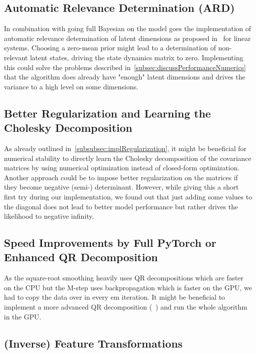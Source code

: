 	\subsection{Automatic Relevance Determination (ARD)}
		\label{subsec:ard}

		In combination with going full Bayesian on the model goes the implementation of automatic relevance determination of latent dimensions as proposed in~\cite{bealVariationalKalmanSmoother2000} for linear systems. Choosing a zero-mean prior might lead to a determination of non-relevant latent states, driving the state dynamics matrix to zero. Implementing this could solve the problems described in~\autoref{subsec:discussPerformanceNumerics} that the algorithm does already have "enough" latent dimensions and drives the variance to a high level on some dimensions.

	\subsection{Better Regularization and Learning the Cholesky Decomposition}
		As already outlined in~\autoref{subsubsec:implRegularization}, it might be beneficial for numerical stability to directly learn the Cholesky decomposition of the covariance matrices by using numerical optimization instead of closed-form optimization. Another approach could be to impose better regularization on the matrices if they become negative (semi-) determinant. However, while giving this a short first try during our implementation, we found out that just adding some values to the diagonal does not lead to better model performance but rather drives the likelihood to negative infinity.

	\subsection{Speed Improvements by Full PyTorch or Enhanced QR Decomposition}
		As the square-root smoothing heavily uses QR decompositions which are faster on the CPU but the M-step uses backpropagation which is faster on the GPU, we had to copy the data over in every \ac{em} iteration. It might be beneficial to implement a more advanced QR decomposition (\eg~\cite{andersonCommunicationAvoidingQRDecomposition2011a}) and run the whole algorithm in the GPU.

	\subsection{(Inverse) Feature Transformations}
